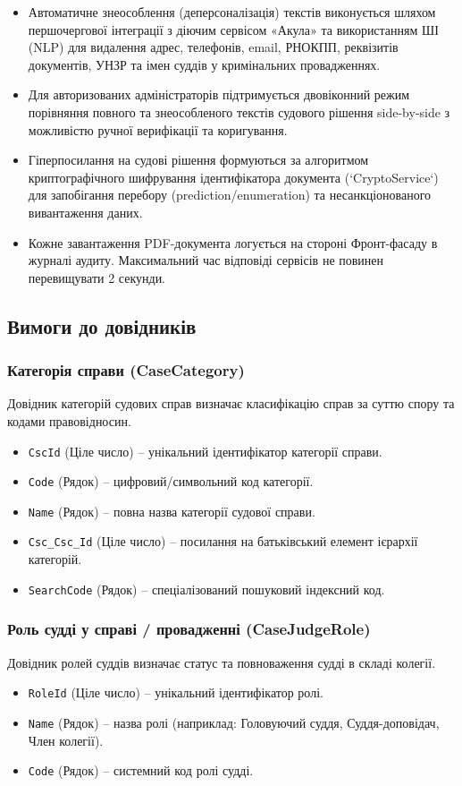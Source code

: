 \documentclass{article}
\begin{document}
\begin{enumerate}
\begin{itemize}
        \item Автоматичне знеособлення (деперсоналізація) текстів виконується шляхом першочергової інтеграції з діючим сервісом «Акула» та використанням ШІ (NLP) для видалення адрес, телефонів, email, РНОКПП, реквізитів документів, УНЗР та імен суддів у кримінальних провадженнях.
        \item Для авторизованих адміністраторів підтримується двовіконний режим порівняння повного та знеособленого текстів судового рішення side-by-side з можливістю ручної верифікації та коригування.
        \item Гіперпосилання на судові рішення формуються за алгоритмом криптографічного шифрування ідентифікатора документа (`CryptoService`) для запобігання перебору (prediction/enumeration) та несанкціонованого вивантаження даних.
        \item Кожне завантаження PDF-документа логується на стороні Фронт-фасаду в журналі аудиту. Максимальний час відповіді сервісів не повинен перевищувати 2 секунди.
    \end{itemize}
\end{enumerate}


\subsection{Вимоги до довідників}

\subsubsection{Категорія справи (CaseCategory)}
Довідник категорій судових справ визначає класифікацію справ за суттю спору та кодами правовідносин.
\begin{itemize}
    \item \texttt{CscId} (Ціле число) -- унікальний ідентифікатор категорії справи.
    \item \texttt{Code} (Рядок) -- цифровий/символьний код категорії.
    \item \texttt{Name} (Рядок) -- повна назва категорії судової справи.
    \item \texttt{Csc\_Csc\_Id} (Ціле число) -- посилання на батьківський елемент ієрархії категорій.
    \item \texttt{SearchCode} (Рядок) -- спеціалізований пошуковий індексний код.
\end{itemize}

\subsubsection{Роль судді у справі / провадженні (CaseJudgeRole)}
Довідник ролей суддів визначає статус та повноваження судді в складі колегії.
\begin{itemize}
    \item \texttt{RoleId} (Ціле число) -- унікальний ідентифікатор ролі.
    \item \texttt{Name} (Рядок) -- назва ролі (наприклад: Головуючий суддя, Суддя-доповідач, Член колегії).
    \item \texttt{Code} (Рядок) -- системний код ролі судді.
\end{itemize}
\end{document}
